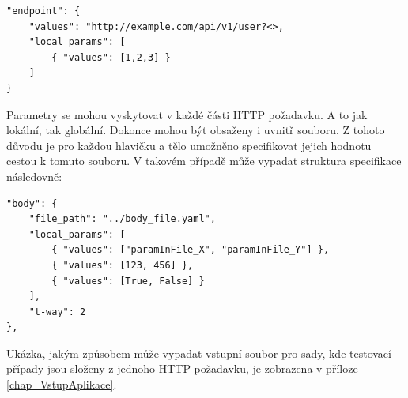 \begin{lstlisting}[language={json2}]
"endpoint": {
	"values": "http://example.com/api/v1/user?<>,
	"local_params": [
		{ "values": [1,2,3] }
	]
}
\end{lstlisting}




Parametry se mohou vyskytovat v každé části HTTP požadavku. A to jak lokální, tak globální. Dokonce mohou být obsaženy i uvnitř souboru. Z tohoto důvodu je pro každou hlavičku a tělo umožněno specifikovat jejich hodnotu cestou k tomuto souboru. V takovém případě může vypadat struktura specifikace následovně: 

\begin{lstlisting}[language={json2}]
"body": {
	"file_path": "../body_file.yaml",
	"local_params": [
		{ "values": ["paramInFile_X", "paramInFile_Y"] },
		{ "values": [123, 456] },
		{ "values": [True, False] }
	],
	"t-way": 2
},
\end{lstlisting}

Ukázka, jakým způsobem může vypadat vstupní soubor pro sady, kde testovací případy jsou složeny z jednoho HTTP požadavku, je zobrazena v příloze \ref{chap_VstupAplikace}.





